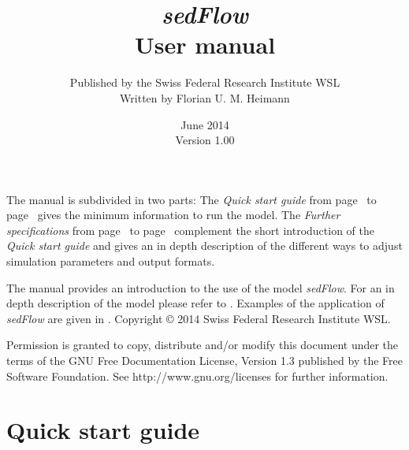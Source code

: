 \documentclass[11pt,a4paper]{article}
\title{\textbf{\emph{sedFlow}\\User manual}}
\author{Published by the Swiss Federal Research Institute WSL\\Written by Florian U. M. Heimann}
\date{June 2014\\Version 1.00}
\begin{document}
\maketitle
\thispagestyle{empty}
\vfill
The manual is subdivided in two parts: The \emph{Quick start guide} from page~\pageref{QuickStartGuideBegin} to page~\pageref{QuickStartGuideEnd} gives the minimum information to run the model. The \emph{Further specifications} from page~\pageref{FurtherSpecificationsBegin} to page~\pageref{FurtherSpecificationsEnd} complement the short introduction of the \emph{Quick start guide} and gives an in depth description of the different ways to adjust simulation parameters and output formats.

\vspace{\baselineskip}The manual provides an introduction to the use of the model \emph{sedFlow}. For an in depth description of the model please refer to \citet{Heimann++2014a}. Examples of the application of \emph{sedFlow} are given in \citet{Heimann++2014b}.
\vfill
\vfill
Copyright \copyright{} 2014 Swiss Federal Research Institute WSL.

Permission is granted to copy, distribute and/or modify this document under the terms of the GNU Free Documentation License, Version 1.3 published by the Free Software Foundation. See http://www.gnu.org/licenses for further information.

\pagebreak
\setcounter{tocdepth}{3}
\tableofcontents
\vfill
\pagebreak

\part{Quick start guide}
\end{document}
